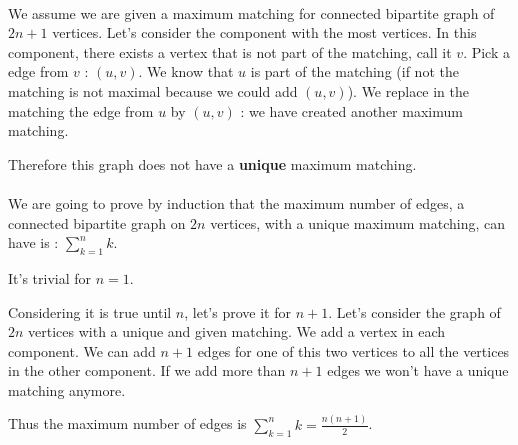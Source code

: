 \paragraph{}
We assume we are given a maximum matching for connected bipartite graph of $2n+1$ vertices. Let's consider the component with the most vertices. In this component, there exists a vertex that is not part of the matching, call it $v$. Pick a edge from $v$ : $(u,v)$. We know that $u$ is part of the matching (if not the matching is not maximal because we could add $(u,v)$). We replace in the matching the edge from $u$ by $(u,v)$ : we have created another maximum matching.

Therefore this graph does not have a \textbf{unique} maximum matching. 


\paragraph{}
We are going to prove by induction that the maximum number of edges, a connected bipartite graph on $2n$ vertices, with a unique maximum matching, can have is : $\sum_{k=1}^n k$.

It's trivial for $n =1$.

Considering it is true until $n$, let's prove it for $n+1$. Let's consider the graph of $2n$ vertices with a unique and given matching. We add a vertex in each component. We can add $n+1$ edges for one of this two vertices to all the vertices in the other component. If we add more than $n+1$ edges we won't have a unique matching anymore.


Thus the maximum number of edges is $\sum_{k=1}^n k = \frac{n(n+1)}{2}$.